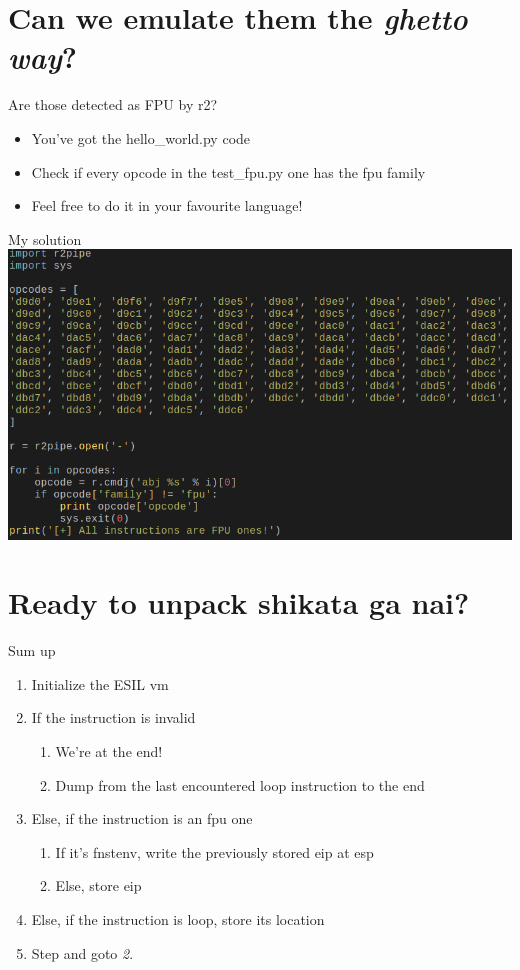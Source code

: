 \documentclass{beamer}
\begin{document}
\section{Can we emulate them the \emph{ghetto way}?}

\begin{frame}{Are those detected as FPU by r2?}
	\begin{itemize}
		\item You've got the \alert{hello\_world.py} code
		\item Check if every opcode in the \alert{test\_fpu.py} one has the \alert{fpu} family
		\item Feel free to do it in your favourite language!
	\end{itemize}
\end{frame}

\begin{frame}{My solution}
	\includegraphics[width=\textwidth]{fpus.png}
\end{frame}

\section{Ready to unpack shikata ga nai?}

\begin{frame}{Sum up}
	\begin{enumerate}
		\item Initialize the ESIL vm
		\item If the instruction is \alert{invalid}
			\begin{enumerate}
				\item We're at the end!
				\item Dump from the last encountered \alert{loop} instruction to the end
			\end{enumerate}
		\item Else, if the instruction is an fpu one
			\begin{enumerate}
				\item If it's \alert{fnstenv}, write the previously stored \alert{eip} at \alert{esp}
				\item Else, store \alert{eip}
			\end{enumerate}
		\item Else, if the instruction is \alert{loop}, store its location
		\item Step and goto \emph{2}.
	\end{enumerate}
\end{frame}
\end{document}
